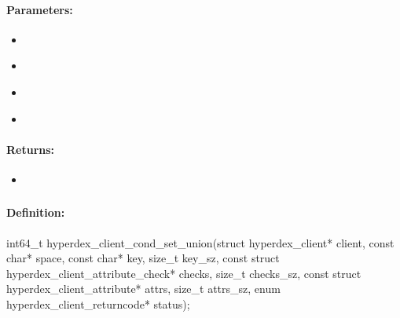 \paragraph{Parameters:}
\begin{itemize}[noitemsep]
\item {}\\

\item {}\\

\item {}\\

\item {}\\

\end{itemize}

\paragraph{Returns:}
\begin{itemize}[noitemsep]
\item {}\\

\end{itemize}

\pagebreak
\subsubsection{}
\label{api:c:cond_set_union}


\paragraph{Definition:}
\begin{ccode}
int64_t hyperdex_client_cond_set_union(struct hyperdex_client* client,
        const char* space,
        const char* key, size_t key_sz,
        const struct hyperdex_client_attribute_check* checks, size_t checks_sz,
        const struct hyperdex_client_attribute* attrs, size_t attrs_sz,
        enum hyperdex_client_returncode* status);
\end{ccode}


